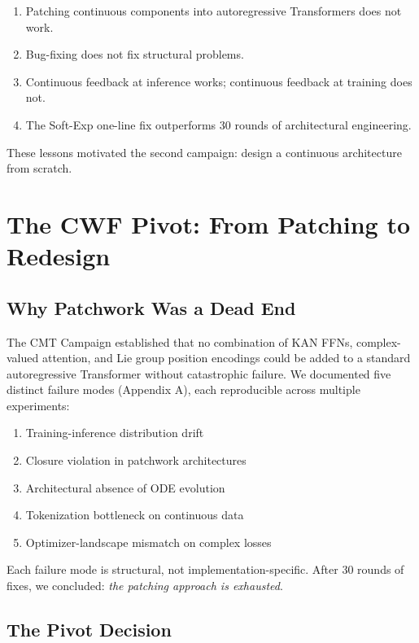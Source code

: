 \documentclass{article}
\begin{document}
\begin{enumerate}
    \item Patching continuous components into autoregressive Transformers does not work.
    \item Bug-fixing does not fix structural problems.
    \item Continuous feedback at inference works; continuous feedback at training does not.
    \item The Soft-Exp one-line fix outperforms 30 rounds of architectural engineering.
\end{enumerate}

These lessons motivated the second campaign: design a continuous architecture from scratch.

\section{The CWF Pivot: From Patching to Redesign}

\subsection{Why Patchwork Was a Dead End}

The CMT Campaign established that no combination of KAN FFNs, complex-valued attention, and Lie group position encodings could be added to a standard autoregressive Transformer without catastrophic failure. We documented five distinct failure modes (Appendix A), each reproducible across multiple experiments:

\begin{enumerate}
    \item Training-inference distribution drift
    \item Closure violation in patchwork architectures
    \item Architectural absence of ODE evolution
    \item Tokenization bottleneck on continuous data
    \item Optimizer-landscape mismatch on complex losses
\end{enumerate}

Each failure mode is structural, not implementation-specific. After 30 rounds of fixes, we concluded: \emph{the patching approach is exhausted}.

\subsection{The Pivot Decision}
\end{document}
